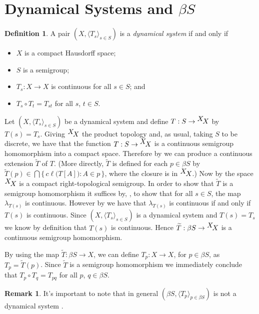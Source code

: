 \documentclass[12pt]{article}
\theoremstyle{plain}
\theoremstyle{definition}
\newtheorem{defn}[thm]{Definition}
\newtheorem{rmk}[thm]{Remark}
\newcommand{\la}{\langle}
\newcommand{\ra}{\rangle}
\newcommand{\ds}{(X, \la T_s \ra_{s\in S})}
\newcommand{\setfunc}[2]{\hbox{${}^{\hbox{$#1$}}\hskip -2 pt #2$}}
\begin{document}
\section{Dynamical Systems and $\beta S$}
\begin{defn}
    A pair $\ds$ is a \textsl{dynamical system} if and only if
      \begin{itemize}
        \item[(1)] $X$ is a compact Hausdorff space;
        \item[(2)] $S$ is a semigroup;
        \item[(3)] $T_s : X \to X$ is continuous for all $s \in S$;
          and
        \item[(4)] $T_s \circ T_t = T_{st}$ for all $s$, $t \in S$.%
       \end{itemize}
  \end{defn}
 Let $\ds$ be a dynamical system and define $T : S \to
    \setfunc{X}{X}$ by $T(s) = T_s$.
Giving $\setfunc{X}{X}$ the product topology and, as usual, taking $S$ to be 
discrete, we have that the function $T :
S \to \setfunc{X}{X}$ is a continuous semigroup
homomorphism into a compact space.
Therefore by \cite[Theorem 3.27]{Hindman:1998fk} we can produce a
continuous extension $\widetilde{T}$ of $T$.
(More directly, $\widetilde{T}$ is defined for each $p \in \beta S$ by
$\widetilde{T}(p) \in \bigcap \{\, c\ell\bigl( T[A] \bigr) : A \in p \,\}$, where
the closure is in $\setfunc{X}{X}$.)
Now by \cite[Theorem 2.22(a)]{Hindman:1998fk} the space $\setfunc{X}{X}$ is
a compact right-topological semigroup.
In order to show that $\widetilde{T}$ is a semigroup homomorphism it
suffices by, \cite[Corollary 4.22]{Hindman:1998fk}, to show that for all
$s \in S$, the
map $\lambda_{T(s)}$ is continuous.
However by \cite[Theorem 2.2(b)]{Hindman:1998fk} we have that
$\lambda_{T(s)}$ is continuous if and only if $T(s)$ is continuous. 
Since $\ds$ is a dynamical system and $T(s) = T_s$ we know by
definition that $T(s)$ is continuous. 
Hence $\widetilde{T} : \beta S \to \setfunc{X}{X}$ is a continuous semigroup
homomorphism.

By using the map $\widetilde{T} : \beta S \to X$, we can define
    $T_p : X \to X$, for $p \in \beta S$, as $T_p =
    \widetilde{T}(p)$. 
    Since $\widetilde{T}$ is a semigroup homomorphism we immediately
    conclude that $T_p \circ T_q = T_{pq}$ for all $p$, $q \in \beta
    S$.

    \begin{rmk}
      It's important to note that in general $(\beta S, \la T_p \ra_{p
  \in \beta S})$ is not a dynamical system \cite[Theorem 6.10 and
Remark 6.11]{Hindman:1998fk}.
    \end{rmk}
\end{document}
